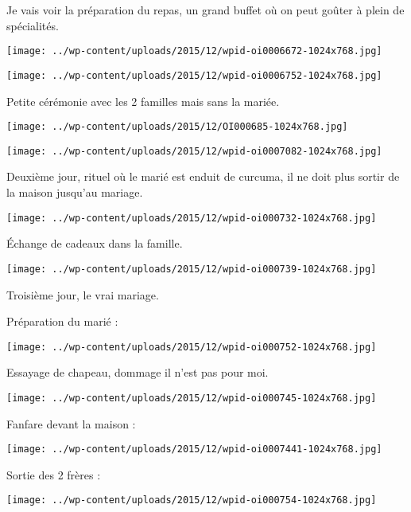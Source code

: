 Je vais voir la préparation du repas, un grand buffet où on peut goûter à plein de spécialités. 
\begin{center} \texttt{[image: ../wp-content/uploads/2015/12/wpid-oi0006672-1024x768.jpg]} \end{center}
\begin{center} \texttt{[image: ../wp-content/uploads/2015/12/wpid-oi0006752-1024x768.jpg]} \end{center}

Petite cérémonie avec les 2 familles mais sans la mariée. 
\begin{center} \texttt{[image: ../wp-content/uploads/2015/12/OI000685-1024x768.jpg]} \end{center}
\begin{center} \texttt{[image: ../wp-content/uploads/2015/12/wpid-oi0007082-1024x768.jpg]} \end{center}

Deuxième jour, rituel où le marié est enduit de curcuma, il ne doit plus sortir de la maison jusqu'au mariage. 
\begin{center} \texttt{[image: ../wp-content/uploads/2015/12/wpid-oi000732-1024x768.jpg]} \end{center}
\pagebreak

Échange de cadeaux dans la famille. 
\begin{center} \texttt{[image: ../wp-content/uploads/2015/12/wpid-oi000739-1024x768.jpg]} \end{center}

Troisième jour, le vrai mariage.

Préparation du marié : 
\begin{center} \texttt{[image: ../wp-content/uploads/2015/12/wpid-oi000752-1024x768.jpg]} \end{center}
\pagebreak

Essayage de chapeau, dommage il n'est pas pour moi. 
\begin{center} \texttt{[image: ../wp-content/uploads/2015/12/wpid-oi000745-1024x768.jpg]} \end{center}

Fanfare devant la maison : 
\begin{center} \texttt{[image: ../wp-content/uploads/2015/12/wpid-oi0007441-1024x768.jpg]} \end{center}
\pagebreak

Sortie des 2 frères : 
\begin{center} \texttt{[image: ../wp-content/uploads/2015/12/wpid-oi000754-1024x768.jpg]} \end{center}

